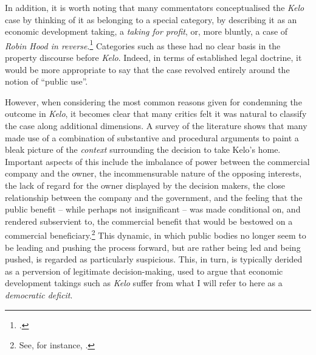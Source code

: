 In addition, it is worth noting that many commentators conceptualised the {\it Kelo} case by thinking of it as belonging to a special category, by describing it as an economic development taking, a {\it taking for profit}, or, more bluntly, a case of {\it Robin Hood in reverse}.\footcite{somin05} Categories such as these had no clear basis in the property discourse before {\it Kelo}. Indeed, in terms of established legal doctrine, it would be more appropriate to say that the case revolved entirely around the notion of ``public use''. 

However, when considering the most common reasons given for condemning the outcome in {\it Kelo}, it becomes clear that many critics felt it was natural to classify the case along additional dimensions. A survey of the literature shows that many made use of a combination of substantive and procedural arguments to paint a bleak picture of the {\it context} surrounding the decision to take Kelo's home. Important aspects of this include the imbalance of power between the commercial company and the owner, the incommensurable nature of the opposing interests, the lack of regard for the owner displayed by the decision makers, the close relationship between the company and the government, and the feeling that the public benefit -- while perhaps not insignificant -- was made conditional on, and rendered subservient to, the commercial benefit that would be bestowed on a commercial beneficiary.\footnote{See, for instance, \cite{underkuffler06,somin07,sandefur06,cohen06,hafetz09,hudson10}.}  This dynamic, in which public bodies no longer seem to be leading and pushing the process forward, but are rather being led and being pushed, is regarded as particularly suspicious. This, in turn, is typically derided as a perversion of legitimate decision-making, used to argue that economic development takings such as {\it Kelo} suffer from what I will refer to here as a {\it democratic deficit}.


